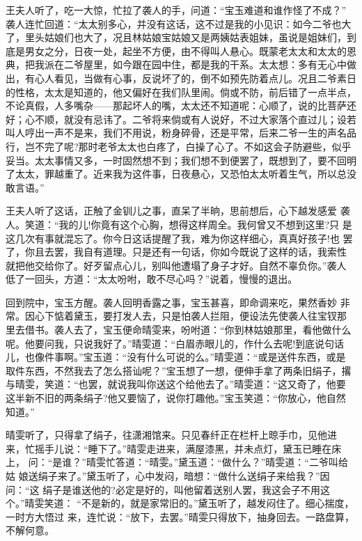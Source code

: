 王夫人听了，吃一大惊，忙拉了袭人的手，问道：“宝玉难道和谁作怪了不成？”
袭人连忙回道：“太太别多心，并没有这话，这不过是我的小见识：如今二爷也大
了，里头姑娘们也大了，况且林姑娘宝姑娘又是两姨姑表姐妹，虽说是姐妹们，到
底是男女之分，日夜一处，起坐不方便，由不得叫人悬心。既蒙老太太和太太的恩
典，把我派在二爷屋里，如今跟在园中住，都是我的干系。太太想：多有无心中做
出，有心人看见，当做有心事，反说坏了的，倒不如预先防着点儿。况且二爷素日
的性格，太太是知道的，他又偏好在我们队里闹。倘或不防，前后错了一点半点，
不论真假，人多嘴杂——那起坏人的嘴，太太还不知道呢：心顺了，说的比菩萨还
好；心不顺，就没有忌讳了。二爷将来倘或有人说好，不过大家落个直过儿；设若
叫人哼出一声不是来，我们不用说，粉身碎骨，还是平常，后来二爷一生的声名品
行，岂不完了呢?那时老爷太太也白疼了，白操了心了。不如这会子防避些，似乎
妥当。太太事情又多，一时固然想不到；我们想不到便罢了，既想到了，要不回明
了太太，罪越重了。近来我为这件事，日夜悬心，又恐怕太太听着生气，所以总没
敢言语。”

王夫人听了这话，正触了金钏儿之事，直呆了半晌，思前想后，心下越发感爱
袭人。笑道：“我的儿!你竟有这个心胸，想得这样周全。我何曾又不想到这里?只
是这几次有事就混忘了。你今日这话提醒了我，难为你这样细心，真真好孩子!也
罢了，你且去罢，我自有道理。只是还有一句话，你如今既说了这样的话，我索性
就把他交给你了。好歹留点心儿，别叫他遭塌了身子才好。自然不辜负你。”袭人
低了一回头，方道：“太太吩咐，敢不尽心吗？”说着，慢慢的退出。

回到院中，宝玉方醒。袭人回明香露之事，宝玉甚喜，即命调来吃，果然香妙
非常。因心下惦着黛玉，要打发人去，只是怕袭人拦阻，便设法先使袭人往宝钗那
里去借书。袭人去了，宝玉便命晴雯来，吩咐道：“你到林姑娘那里，看他做什么
呢。他要问我，只说我好了。”晴雯道：“白眉赤眼儿的，作什么去呢!到底说句话
儿，也像件事啊。”宝玉道：“没有什么可说的么。”晴雯道：“或是送件东西，或是
取件东西，不然我去了怎么搭讪呢？”宝玉想了一想，便伸手拿了两条旧绢子，撂
与晴雯，笑道：“也罢，就说我叫你送这个给他去了。”晴雯道：“这又奇了，他要
这半新不旧的两条绢子?他又要恼了，说你打趣他。”宝玉笑道：“你放心，他自然
知道。”

晴雯听了，只得拿了绢子，往潇湘馆来。只见春纤正在栏杆上晾手巾，见他进
来，忙摇手儿说：“睡下了。”晴雯走进来，满屋漆黑，并未点灯，黛玉已睡在床上，
问：“是谁？”晴雯忙答道：“晴雯。”黛玉道：“做什么？”晴雯道：“二爷叫给姑
娘送绢子来了。”黛玉听了，心中发闷，暗想：“做什么送绢子来给我？”因问：“这
绢子是谁送他的?必定是好的，叫他留着送别人罢，我这会子不用这个。”晴雯笑道：
“不是新的，就是家常旧的。”黛玉听了，越发闷住了。细心揣度，一时方大悟过
来，连忙说：“放下，去罢。”晴雯只得放下，抽身回去。一路盘算，不解何意。

